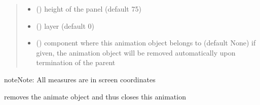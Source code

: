 \documentclass[letterpaper,10pt,english]{sphinxmanual}
\begin{document}
\begin{fulllineitems}
\begin{quote}
\begin{description}
\begin{itemize}
\item {} 
 () \textendash{} height of the panel (default 75)

\item {} 
 () \textendash{} layer (default 0)

\item {} 
 ({\hyperref[\detokenize{Reference:salabim.Component}]{}}) \textendash{} component where this animation object belongs to (default None) 
if given, the animation object will be removed
automatically upon termination of the parent

\end{itemize}

\end{description}\end{quote}

\begin{sphinxadmonition}{note}{Note:}
All measures are in screen coordinates 
\end{sphinxadmonition}

\begin{fulllineitems}
\label{\detokenize{Reference:salabim.AnimateMonitor.remove}}
removes the animate object and thus closes this animation

\end{fulllineitems}


\end{fulllineitems}

\end{document}
